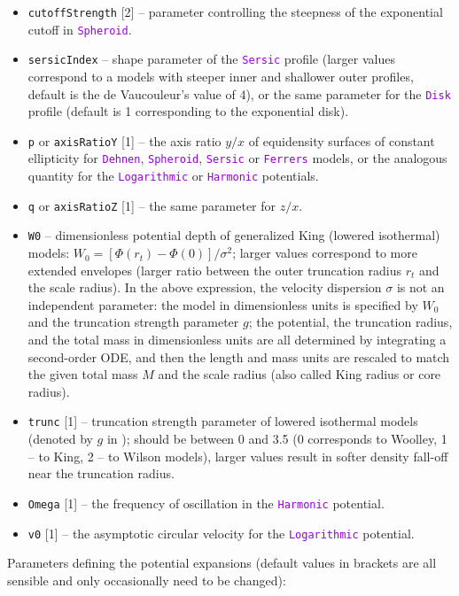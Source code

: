 \documentclass[12pt]{article}
\newcommand{\ttt}[1]{\textcolor{darkviolet}{\texttt{#1}}}
\newcommand{\ppp}[1]{\textcolor{darkolive} {\texttt{#1}}}
\begin{document}
\begin{itemize}
\item \ppp{cutoffStrength} [2] -- parameter controlling the steepness of the exponential cutoff in \ttt{Spheroid}.
\item \ppp{sersicIndex} -- shape parameter of the \ttt{Sersic} profile (larger values correspond to a models with steeper inner and shallower outer profiles, default is the de Vaucouleur's value of 4), or the same parameter for the \ttt{Disk} profile (default is 1 corresponding to the exponential disk).
\item \ppp{p} or \ppp{axisRatioY} [1] -- the axis ratio $y/x$ of equidensity surfaces of constant ellipticity for \ttt{Dehnen}, \ttt{Spheroid}, \ttt{Sersic} or \ttt{Ferrers} models, or the analogous quantity for the \ttt{Logarithmic} or \ttt{Harmonic} potentials.
\item \ppp{q} or \ppp{axisRatioZ} [1] -- the same parameter for $z/x$.
\item \ppp{W0} -- dimensionless potential depth of generalized King (lowered isothermal) models: $W_0 = [ \Phi(r_t) - \Phi(0) ] / \sigma^2$; larger values correspond to more extended envelopes (larger ratio between the outer truncation radius $r_t$ and the scale radius). In the above expression, the velocity dispersion $\sigma$ is not an independent parameter: the model in dimensionless units is specified by $W_0$ and the truncation strength parameter $g$; the potential, the truncation radius, and the total mass in dimensionless units are all determined by integrating a second-order ODE, and then the length and mass units are rescaled to match the given total mass $M$ and the scale radius (also called King radius or core radius).
\item \ppp{trunc} [1] -- truncation strength parameter of lowered isothermal models (denoted by $g$ in \cite{GielesZocchi2015}); should be between 0 and 3.5 (0 corresponds to Woolley, 1 -- to King, 2 -- to Wilson models), larger values result in softer density fall-off near the truncation radius.
\item \ppp{Omega} [1] -- the frequency of oscillation in the \ttt{Harmonic} potential.
\item \ppp{v0} [1] -- the asymptotic circular velocity for the \ttt{Logarithmic} potential.
\end{itemize}
Parameters defining the potential expansions (default values in brackets are all sensible and only occasionally need to be changed):
\end{document}
